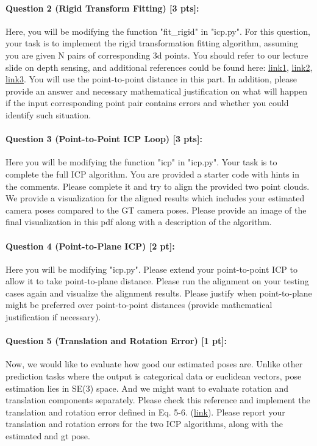 \documentclass[11pt]{article}
\begin{document}
\paragraph{Question 2 (Rigid Transform Fitting) [3 pts]:} Here, you will be modifying the function "fit\_rigid" in "icp.py". For this question, your task is to implement the rigid transformation fitting algorithm, assuming you are given N pairs of corresponding 3d points. You should refer to our lecture slide on depth sensing, and additional references could be found here: \href{https://www.ltu.se/cms_fs/1.51590!/svd-fitting.pdf}{link1}, \href{https://igl.ethz.ch/projects/ARAP/svd_rot.pdf}{link2}, \href{https://en.wikipedia.org/wiki/Orthogonal_Procrustes_problem}{link3}. You will use the point-to-point distance in this part. 
In addition, please provide an answer and necessary mathematical justification on what will happen if the input corresponding point pair contains errors and whether you could identify such situation. %

\paragraph{Question 3 (Point-to-Point ICP Loop) [3 pts]:} Here you will be modifying the function "icp" in "icp.py". Your task is to complete the full ICP algorithm. You are provided a starter code with hints in the comments. Please complete it and try to align the provided two point clouds. We provide a visualization for the aligned results which includes your estimated camera poses compared to the GT camera poses. Please provide an image of the final visualization in this pdf along with a description of the algorithm.

\paragraph{Question 4 (Point-to-Plane ICP) [2 pt]:} Here you will be modifying "icp.py". Please extend your point-to-point ICP to allow it to take point-to-plane distance. Please run the alignment on your testing cases again and visualize the alignment results. Please justify when point-to-plane might be preferred over point-to-point distances (provide mathematical justification if necessary). 

\paragraph{Question 5 (Translation and Rotation Error) [1 pt]:} Now, we would like to evaluate how good our estimated poses are. Unlike other prediction tasks where the output is categorical data or euclidean vectors, pose estimation lies in SE(3) space. And we might want to evaluate rotation and translation components separately. Please check this reference and implement the translation and rotation error defined in Eq. 5-6. (\href{https://cmp.felk.cvut.cz/~hodanto2/data/hodan2016evaluation.pdf}{link}). Please report your translation and rotation errors for the two ICP algorithms, along with the estimated and gt pose.  
\end{document}
